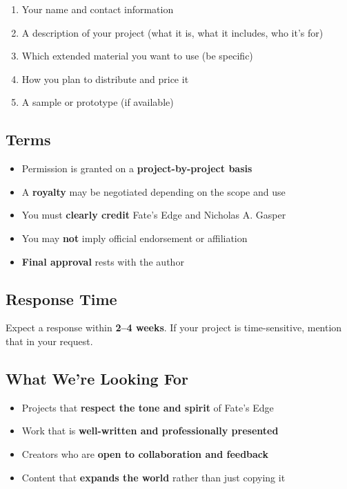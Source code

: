 \documentclass[11pt]{article}
\begin{document}
\begin{enumerate}[leftmargin=*, itemsep=2pt]
  \item Your name and contact information
  \item A description of your project (what it is, what it includes, who it's for)
  \item Which extended material you want to use (be specific)
  \item How you plan to distribute and price it
  \item A sample or prototype (if available)
\end{enumerate}

\subsection*{Terms}

\begin{itemize}[leftmargin=*, itemsep=2pt]
  \item Permission is granted on a \textbf{project-by-project basis}
  \item A \textbf{royalty} may be negotiated depending on the scope and use
  \item You must \textbf{clearly credit} Fate's Edge and Nicholas A. Gasper
  \item You may \textbf{not} imply official endorsement or affiliation
  \item \textbf{Final approval} rests with the author
\end{itemize}

\subsection*{Response Time}

Expect a response within \textbf{2--4 weeks}. If your project is time-sensitive, mention that in your request.

\subsection*{What We're Looking For}

\begin{itemize}[leftmargin=*, itemsep=2pt]
  \item Projects that \textbf{respect the tone and spirit} of Fate's Edge
  \item Work that is \textbf{well-written and professionally presented}
  \item Creators who are \textbf{open to collaboration and feedback}
  \item Content that \textbf{expands the world} rather than just copying it
\end{itemize}
\end{document}
